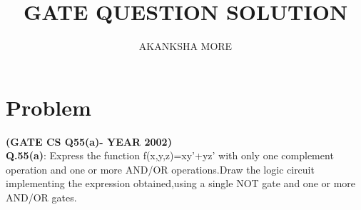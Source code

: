 \documentclass[a4paper,11pt]{article}
\title{\textbf{ GATE QUESTION SOLUTION }}
\author{AKANKSHA MORE}
\begin{document}
\date{}
\maketitle

\tableofcontents

\newpage
\section{Problem}
\label{sec:ques}
\textbf{(GATE CS Q55(a)- YEAR 2002)}\\
\textbf{Q.55(a)}: Express the function f(x,y,z)=xy'+yz' with only one complement operation and one or more AND/OR operations.Draw the logic circuit implementing the expression obtained,using a single NOT gate and one or more AND/OR gates.
\end{document}
